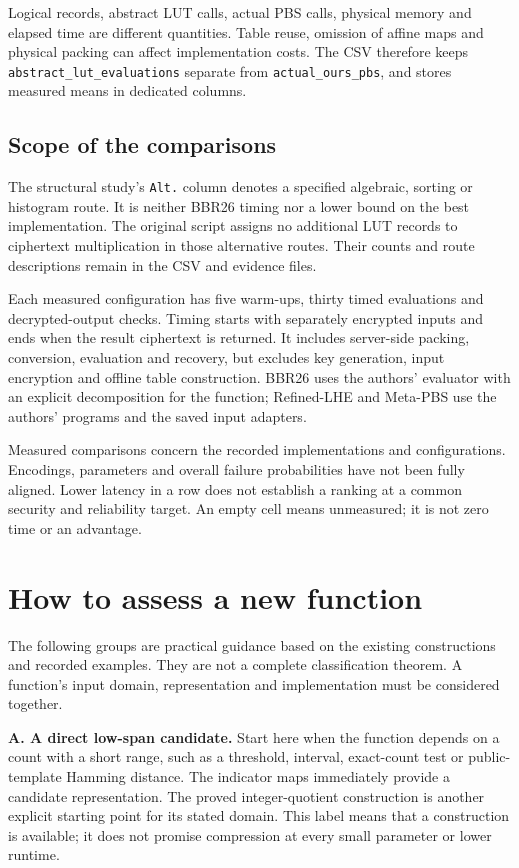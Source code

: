 \documentclass[a4paper,10pt]{article}
\newif\ifappmarked
\newcommand{\appadd}[1]{\ifappmarked{\color{blue}#1}\else#1\fi}
\begin{document}
Logical records, abstract LUT calls, actual PBS calls, physical memory and elapsed time are different quantities. Table reuse, omission of affine maps and physical packing can affect implementation costs. The CSV therefore keeps \texttt{abstract\_lut\_evaluations} separate from \texttt{actual\_ours\_pbs}, and stores measured means in dedicated columns.

\subsection{Scope of the comparisons}
The structural study's \texttt{Alt.} column denotes a specified algebraic, sorting or histogram route. It is neither BBR26 timing nor a lower bound on the best implementation. The original script assigns no additional LUT records to ciphertext multiplication in those alternative routes. Their counts and route descriptions remain in the CSV and evidence files.

Each measured configuration has five warm-ups, thirty timed evaluations and decrypted-output checks. Timing starts with separately encrypted inputs and ends when the result ciphertext is returned. It includes server-side packing, conversion, evaluation and recovery, but excludes key generation, input encryption and offline table construction. BBR26 uses the authors' evaluator with an explicit decomposition for the function; Refined-LHE and Meta-PBS use the authors' programs and the saved input adapters.

Measured comparisons concern the recorded implementations and configurations. Encodings, parameters and overall failure probabilities have not been fully aligned. Lower latency in a row does not establish a ranking at a common security and reliability target. An empty cell means unmeasured; it is not zero time or an advantage.

\newpage
\section*{\appadd{How to assess a new function}}
\appadd{The following groups are practical guidance based on the existing constructions and recorded examples. They are not a complete classification theorem. A function's input domain, representation and implementation must be considered together.}

\appadd{\textbf{A. A direct low-span candidate.} Start here when the function depends on a count with a short range, such as a threshold, interval, exact-count test or public-template Hamming distance. The indicator maps immediately provide a candidate representation. The proved integer-quotient construction is another explicit starting point for its stated domain. This label means that a construction is available; it does not promise compression at every small parameter or lower runtime.}
\end{document}

